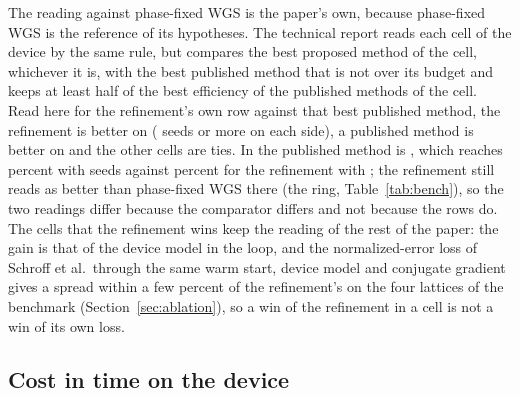 The reading against phase-fixed WGS is the paper's own, because phase-fixed WGS is the reference of its hypotheses. The technical report reads each cell of the device by the same rule, but compares the best proposed method of the cell, whichever it is, with the best published method that is not over its budget and keeps at least half of the best efficiency of the published methods of the cell. Read here for the refinement's own row against that best published method, the refinement is better on \benchAllRefWinList{} (\benchAllRefWinMinN{} seeds or more on each side), a published method is better on \benchAllPubWinList{} and the other \benchAllTies{} cells are ties. In \benchAllPubWinList{} the published method is \benchAllPubName{}, which reaches \benchAllPubSigma{} percent with \benchAllPubN{} seeds against \benchAllPubRefSigma{} percent for the refinement with \benchAllPubRefN{}; the refinement still reads as better than phase-fixed WGS there (the ring, Table~\ref{tab:bench}), so the two readings differ because the comparator differs and not because the rows do. The cells that the refinement wins keep the reading of the rest of the paper: the gain is that of the device model in the loop, and the normalized-error loss of Schroff et al.\ through the same warm start, device model and conjugate gradient gives a spread within a few percent of the refinement's on the four lattices of the benchmark (Section~\ref{sec:ablation}), so a win of the refinement in a cell is not a win of its own loss.

\subsection{Cost in time on the device}

